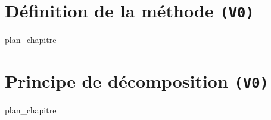 %
\chapter{Définition de la méthode \texttt{(V0)}}
\label{chap:04}
{plan_chapitre}
%
\chapter{Principe de décomposition \texttt{(V0)}}
\label{chap:05}
{plan_chapitre}
